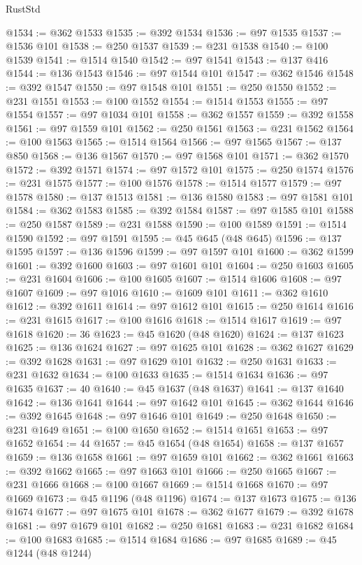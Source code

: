 \begin{lexlean}{RustStd}
\begin{coremodule}
@1534 := @362 @1533
@1535 := @392 @1534
@1536 := @97 @1535
@1537 := @1536 @101
@1538 := @250 @1537
@1539 := @231 @1538
@1540 := @100 @1539
@1541 := @1514 @1540
@1542 := @97 @1541
@1543 := @137 @416
@1544 := @136 @1543
@1546 := @97 @1544 @101
@1547 := @362 @1546
@1548 := @392 @1547
@1550 := @97 @1548 @101
@1551 := @250 @1550
@1552 := @231 @1551
@1553 := @100 @1552
@1554 := @1514 @1553
@1555 := @97 @1554
@1557 := @97 @1034 @101
@1558 := @362 @1557
@1559 := @392 @1558
@1561 := @97 @1559 @101
@1562 := @250 @1561
@1563 := @231 @1562
@1564 := @100 @1563
@1565 := @1514 @1564
@1566 := @97 @1565
@1567 := @137 @850
@1568 := @136 @1567
@1570 := @97 @1568 @101
@1571 := @362 @1570
@1572 := @392 @1571
@1574 := @97 @1572 @101
@1575 := @250 @1574
@1576 := @231 @1575
@1577 := @100 @1576
@1578 := @1514 @1577
@1579 := @97 @1578
@1580 := @137 @1513
@1581 := @136 @1580
@1583 := @97 @1581 @101
@1584 := @362 @1583
@1585 := @392 @1584
@1587 := @97 @1585 @101
@1588 := @250 @1587
@1589 := @231 @1588
@1590 := @100 @1589
@1591 := @1514 @1590
@1592 := @97 @1591
@1595 := @45 @645 (@48 @645)
@1596 := @137 @1595
@1597 := @136 @1596
@1599 := @97 @1597 @101
@1600 := @362 @1599
@1601 := @392 @1600
@1603 := @97 @1601 @101
@1604 := @250 @1603
@1605 := @231 @1604
@1606 := @100 @1605
@1607 := @1514 @1606
@1608 := @97 @1607
@1609 := @97 @1016
@1610 := @1609 @101
@1611 := @362 @1610
@1612 := @392 @1611
@1614 := @97 @1612 @101
@1615 := @250 @1614
@1616 := @231 @1615
@1617 := @100 @1616
@1618 := @1514 @1617
@1619 := @97 @1618
@1620 := 36
@1623 := @45 @1620 (@48 @1620)
@1624 := @137 @1623
@1625 := @136 @1624
@1627 := @97 @1625 @101
@1628 := @362 @1627
@1629 := @392 @1628
@1631 := @97 @1629 @101
@1632 := @250 @1631
@1633 := @231 @1632
@1634 := @100 @1633
@1635 := @1514 @1634
@1636 := @97 @1635
@1637 := 40
@1640 := @45 @1637 (@48 @1637)
@1641 := @137 @1640
@1642 := @136 @1641
@1644 := @97 @1642 @101
@1645 := @362 @1644
@1646 := @392 @1645
@1648 := @97 @1646 @101
@1649 := @250 @1648
@1650 := @231 @1649
@1651 := @100 @1650
@1652 := @1514 @1651
@1653 := @97 @1652
@1654 := 44
@1657 := @45 @1654 (@48 @1654)
@1658 := @137 @1657
@1659 := @136 @1658
@1661 := @97 @1659 @101
@1662 := @362 @1661
@1663 := @392 @1662
@1665 := @97 @1663 @101
@1666 := @250 @1665
@1667 := @231 @1666
@1668 := @100 @1667
@1669 := @1514 @1668
@1670 := @97 @1669
@1673 := @45 @1196 (@48 @1196)
@1674 := @137 @1673
@1675 := @136 @1674
@1677 := @97 @1675 @101
@1678 := @362 @1677
@1679 := @392 @1678
@1681 := @97 @1679 @101
@1682 := @250 @1681
@1683 := @231 @1682
@1684 := @100 @1683
@1685 := @1514 @1684
@1686 := @97 @1685
@1689 := @45 @1244 (@48 @1244)

\end{coremodule}
\end{lexlean}
